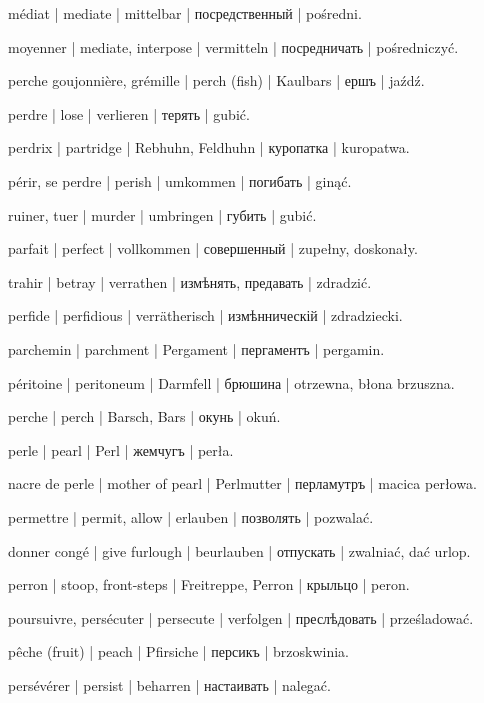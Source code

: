 \begin{outdent}{1em}
\uvsubentry{}
médiat | mediate | mittelbar | посредственный | pośredni.


\uvsubentry{}
moyenner | mediate, interpose | vermitteln | посредничать | pośredniczyć.

perche goujonnière, grémille | perch (fish) | Kaulbars | ершъ | jaźdź.

perdre | lose | verlieren | терять | gubić.

perdrix | partridge | Rebhuhn, Feldhuhn | куропатка | kuropatwa.

périr, se perdre | perish | umkommen | погибать | ginąć.

\uvsubentry{}
ruiner, tuer | murder | umbringen | губить | gubić.

parfait | perfect | vollkommen | совершенный | zupełny, doskonały.

trahir | betray | verrathen | измѣнять, предавать | zdradzić.

\uvsubentry{}
perfide | perfidious | verrätherisch | измѣнническій | zdradziecki.

parchemin | parchment | Pergament | пергаментъ | pergamin.

péritoine | peritoneum | Darmfell | брюшина | otrzewna,
błona brzuszna.

perche | perch | Barsch, Bars | окунь | okuń.

perle | pearl | Perl | жемчугъ | perła.

nacre de perle | mother of pearl | Perlmutter | перламутръ | macica perłowa.

permettre | permit, allow | erlauben | позволять | pozwalać.

\uvsubentry{}
donner congé | give furlough | beurlauben | отпускать | zwalniać, dać urlop.

perron | stoop, front-steps | Freitreppe, Perron | крыльцо | peron.

poursuivre, persécuter | persecute | verfolgen | преслѣдовать | prześladować.

pêche (fruit) | peach | Pfirsiche | персикъ | brzoskwinia.

persévérer | persist | beharren | настаивать | nalegać.


\end{outdent}
